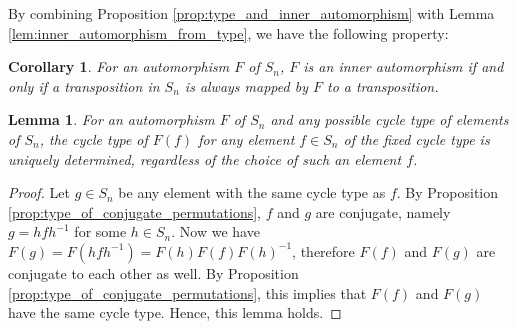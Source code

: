\documentclass[11pt]{article}
\newtheorem{lemma}{Lemma}
\newtheorem{corollary}{Corollary}
\begin{document}
By combining Proposition \ref{prop:type_and_inner_automorphism} with Lemma \ref{lem:inner_automorphism_from_type}, we have the following property:

\begin{corollary}
For an automorphism $F$ of $S_n$, $F$ is an inner automorphism if and only if a transposition in $S_n$ is always mapped by $F$ to a transposition.
\end{corollary}

\begin{lemma}
\label{lem:type_of_image_is_function_of_type}
For an automorphism $F$ of $S_n$ and any possible cycle type of elements of $S_n$, the cycle type of $F(f)$ for any element $f \in S_n$ of the fixed cycle type is uniquely determined, regardless of the choice of such an element $f$.
\end{lemma}
\begin{proof}
Let $g \in S_n$ be any element with the same cycle type as $f$.
By Proposition \ref{prop:type_of_conjugate_permutations}, $f$ and $g$ are conjugate, namely $g = hfh^{-1}$ for some $h \in S_n$.
Now we have $F(g) = F(hfh^{-1}) = F(h)F(f)F(h)^{-1}$, therefore $F(f)$ and $F(g)$ are conjugate to each other as well.
By Proposition \ref{prop:type_of_conjugate_permutations}, this implies that $F(f)$ and $F(g)$ have the same cycle type.
Hence, this lemma holds.
\end{proof}
\end{document}
